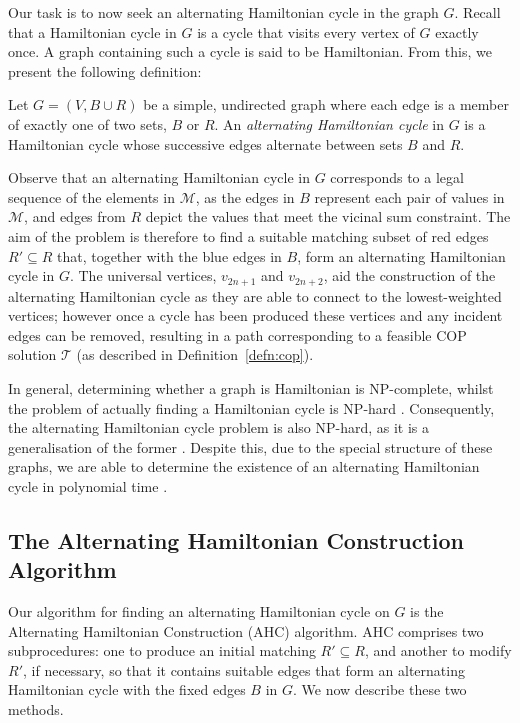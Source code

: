 \documentclass[a4paper,11pt,authoryear]{elsarticle}
\begin{document}
Our task is to now seek an alternating Hamiltonian cycle in the graph $G$. Recall that a Hamiltonian cycle in $G$ is a cycle that visits every vertex of $G$ exactly once. A graph containing such a cycle is said to be Hamiltonian. From this, we present the following definition:

\begin{definition} %
	Let $G = (V, B \cup R)$ be a simple, undirected graph where each edge is a member of exactly one of two sets, $B$ or $R$. An \emph{alternating Hamiltonian cycle} in $G$ is a Hamiltonian cycle whose successive edges alternate between sets $B$ and $R$.
	\label{defn:althamcycle}
\end{definition}

\noindent Observe that an alternating Hamiltonian cycle in $G$ corresponds to a legal sequence of the elements in $\mathcal{M}$, as the edges in $B$ represent each pair of values in $\mathcal{M}$, and edges from $R$ depict the values that meet the vicinal sum constraint. The aim of the problem is therefore to find a suitable matching subset of red edges $R' \subseteq R$ that, together with the blue edges in $B$, form an alternating Hamiltonian cycle in $G$. The universal vertices, $v_{2n+1}$ and $v_{2n+2}$, aid the construction of the alternating Hamiltonian cycle as they are able to connect to the lowest-weighted vertices; however once a cycle has been produced these vertices and any incident edges can be removed, resulting in a path corresponding to a feasible COP solution $\mathcal{T}$ (as described in Definition~\ref{defn:cop}).

In general, determining whether a graph is Hamiltonian is NP-complete, whilst the problem of actually finding a Hamiltonian cycle is NP-hard \citep{karp1972}. Consequently, the alternating Hamiltonian cycle problem is also NP-hard, as it is a generalisation of the former \citep{haggkvist1977}. Despite this, due to the special structure of these graphs, we are able to determine the existence of an alternating Hamiltonian cycle in polynomial time \citep{hawa2018}. 

\subsection{The Alternating Hamiltonian Construction Algorithm}
\label{sub:ahc}
\noindent Our algorithm for finding an alternating Hamiltonian cycle on $G$ is the Alternating Hamiltonian Construction (AHC) algorithm. AHC comprises two subprocedures: one to produce an initial matching $R' \subseteq R$, and another to modify $R'$, if necessary, so that it contains suitable edges that form an alternating Hamiltonian cycle with the fixed edges $B$ in $G$. We now describe these two methods.
\end{document}
